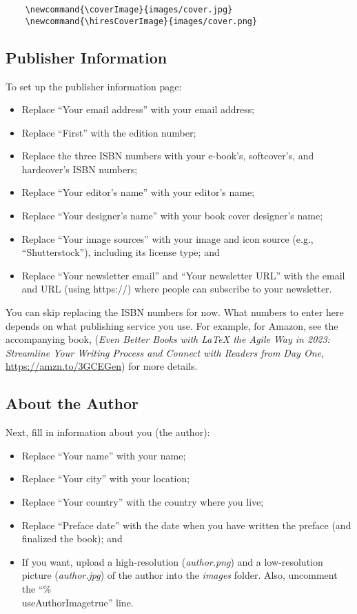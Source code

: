 \begin{lstlisting}
    \newcommand{\coverImage}{images/cover.jpg}
    \newcommand{\hiresCoverImage}{images/cover.png}
\end{lstlisting}



\subsection{Publisher Information}

To set up the publisher information page:

\begin{itemize}
\item Replace ``Your email address'' with your email address;
\item Replace ``First'' with the edition number;
\item Replace the three ISBN numbers with your e-book's, softcover's, and hardcover's ISBN numbers;
\item Replace ``Your editor's name'' with your editor's name;
\item Replace ``Your designer's name'' with your book cover designer's name;
\item Replace ``Your image sources'' with your image and icon source (e.g., ``Shutterstock''), including its license type; and
\item Replace ``Your newsletter email'' and ``Your newsletter URL'' with the email and URL (using https://) where people can subscribe to your newsletter.
\end{itemize}

You can skip replacing the ISBN numbers for now. What numbers to enter here depends on what publishing service you use. For example, for Amazon, see the accompanying book, (\textit{Even Better Books with LaTeX the Agile Way in 2023: Streamline Your Writing Process and Connect with Readers from Day One}, \url{https://amzn.to/3GCEGen}) for more details.


\subsection{About the Author}

Next, fill in information about you (the author):

\begin{itemize}
    \item Replace ``Your name'' with your name;
    \item Replace ``Your city'' with your location;
    \item Replace ``Your country'' with the country where you live;
    \item Replace ``Preface date'' with the date when you have written the preface (and finalized the book); and
    \item If you want, upload a high-resolution (\textit{author.png}) and a low-resolution picture (\textit{author.jpg}) of the author into the \textit{images} folder. Also, uncomment the ``\%\\useAuthorImagetrue'' line.
\end{itemize}




